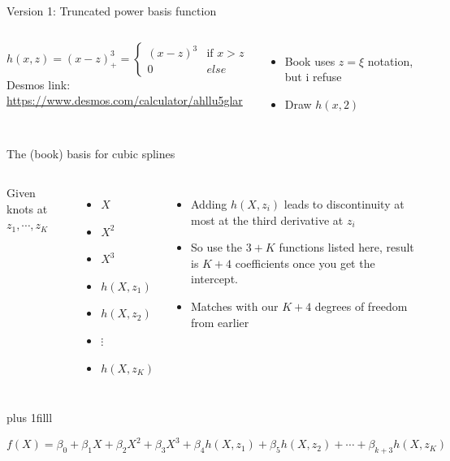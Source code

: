 \documentclass[aspectratio=169,usenames,dvipsnames]{beamer}
\newcommand{\InstructorList}[1]{
\begin{itemize}
	\color{orange}
	#1
\end{itemize}
}
\newcommand{\bvfill}{\vskip0pt plus 1filll}
\begin{document}
\begin{frame}[t]{Version 1: Truncated power basis function}

\begin{columns}
\centering

\begin{equation*}
h(x,z) = (x-z)^3_+ =
\begin{cases}
	(x-z)^3 & \text{if } x>z \\
	0 & else
\end{cases}
\end{equation*}
Desmos link:
\url{https://www.desmos.com/calculator/ahllu5glar}
\centering
\InstructorList{
  \item Book uses $z=\xi$ notation, but i refuse
	\item Draw $h(x,2)$
}

\end{columns}

\end{frame}
\begin{frame}[t]{The (book) basis for cubic splines }

\begin{columns}
\centering
Given knots at $z_1,\cdots,z_K$
\begin{itemize}
	\item $X$
	\item $X^2$
	\item $X^3$
	\item $h(X,z_1)$
	\item $h(X,z_2)$
	\item $\vdots$
	\item $h(X,z_K)$
\end{itemize}
\centering


\InstructorList{
  \item Adding $h(X,z_i)$ leads to discontinuity at most at the third derivative at $z_i$
	\item So use the $3+K$ functions listed here, result is $K+4$ coefficients once you get the intercept.
	\item Matches with our $K+4$ degrees of freedom from earlier
}

\end{columns}

\bvfill

\begin{equation*}
	f(X) = 	
	\beta_0 + 
	\beta_1 X + 
	\beta_2 X^2 + 
	\beta_3 X^3 + 
	\beta_4 h(X,z_1) + 
	\beta_5 h(X,z_2) + 
	\cdots + 
	\beta_{k+3}  h(X,z_K)
\end{equation*}


\end{frame}
\end{document}

